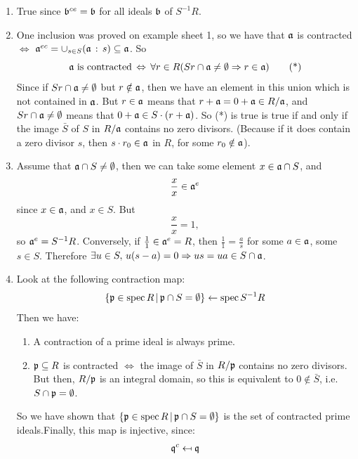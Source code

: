 \documentclass{article}
\begin{document}
\begin{enumerate}
    \item True since $\mathfrak{b}^{ce}=\mathfrak{b}$ for all ideals $\mathfrak{b}$ of $S^{-1}R$.
    \item One inclusion was proved on example sheet 1, so we have that $\mathfrak{a}$ is contracted $\Leftrightarrow$ $\mathfrak{a}^{ec} = \cup_{s \in S} (\mathfrak{a} \, : \, s) \subseteq \mathfrak{a}$. So \[ \text{$\mathfrak{a}$ is contracted} \, \Leftrightarrow \, \forall r \in R (Sr \cap \mathfrak{a} \neq \emptyset \Rightarrow r \in \mathfrak{a}) \tag{*}\] Since if $Sr \cap \mathfrak{a} \neq \emptyset$ but $r \notin \mathfrak{a}$, then we have an element in this union which is not contained in $\mathfrak{a}$. \gap 
    But $r \in \mathfrak{a}$ means that $r+ \mathfrak{a} = 0 + \mathfrak{a} \in R/\mathfrak{a}$, and $Sr \cap \mathfrak{a} \neq \emptyset$ means that $0+\mathfrak{a} \in S \cdot (r + \mathfrak{a})$. So (*) is true is true if and only if the image $\bar S$ of $S$ in $R/\mathfrak{a}$ contains no zero divisors. (Because if it does contain a zero divisor $s$, then $s \cdot r_{0}\in \mathfrak{a}$ in $R$, for some $r_{0} \notin \mathfrak{a}$).
    \item Assume that $\mathfrak{a} \cap S \neq \emptyset$, then we can take some element $x \in \mathfrak{a} \cap S$, and \[\frac{x}{x} \in \mathfrak{a}^{e}\] since $x \in \mathfrak{a}$, and $x \in S$. But \[ \frac{x}{x}=1, \] so $\mathfrak{a}^{e} = S^{-1}R$. \gap 
    Conversely, if $\frac{1}{1} \in \mathfrak{a}^{e} = R$, then $\frac{1}{1} = \frac{a}{s}$ for some $a \in \mathfrak{a}$, some $s \in S$. Therefore $\exists u \in S, \, u(s-a)=0 \Rightarrow us = ua \in S \cap \mathfrak{a}$.
    \item Look at the following contraction map: \begin{align*}
        \{ \mathfrak{p} \in \operatorname{spec} R \, | \, \mathfrak{p} \cap S = \emptyset \} \leftarrow \operatorname{spec} S^{-1}R
    \end{align*}
    Then we have: \begin{enumerate}
        \item A contraction of a prime ideal is always prime.
        \item $\mathfrak{p} \subseteq R$ is contracted $\Leftrightarrow$ the image of $\bar S$ in $R / \mathfrak{p}$ contains no zero divisors. But then, $R/\mathfrak{p}$ is an integral domain, so this is equivalent to $0 \notin \bar S$, i.e. $S \cap \mathfrak{p} = \emptyset$.
    \end{enumerate}
    So we have shown that $\{ \mathfrak{p} \in \operatorname{spec} R \, | \, \mathfrak{p} \cap S = \emptyset \}$ is the set of contracted prime ideals.\gap Finally, this map is injective, since: \begin{align*}
        \frakq^{c} \mapsfrom \frakq

\end{align*}
\end{enumerate}
\end{document}
